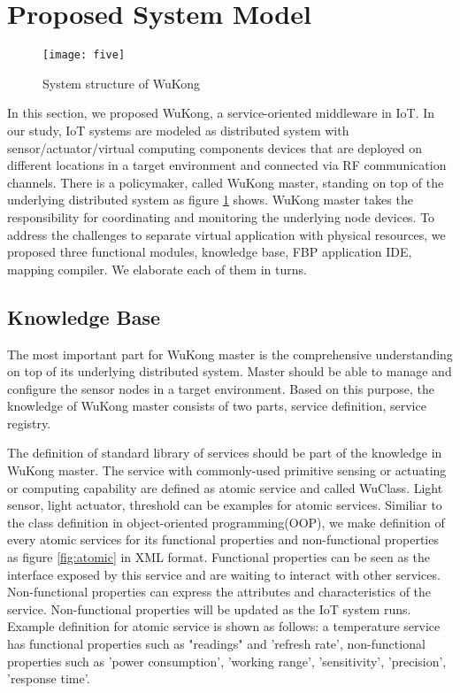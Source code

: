 \section{Proposed System Model}
\label{c:system_model}

\begin{figure}[!t]
\centering
\texttt{[image: five]}
\caption{System structure of WuKong}
\label{fig_structure}
\end{figure}


In this section, we proposed WuKong, a service-oriented middleware in IoT. In our study, IoT systems are modeled as distributed system with sensor/actuator/virtual computing components devices that are deployed on different locations in a target environment and connected via RF communication channels. There is a policymaker, called WuKong master, standing on top of the underlying distributed system as figure \ref{fig_structure} shows. WuKong master takes the responsibility for coordinating and monitoring the underlying node devices. To address the challenges to separate virtual application with physical resources, we proposed three functional modules, knowledge base, FBP application IDE, mapping compiler. We elaborate each of them in turns. 

\subsection{Knowledge Base}

The most important part for WuKong master is the comprehensive understanding on top of its underlying distributed system. Master should be able to manage and configure the sensor nodes in a target environment. Based on this purpose, the knowledge of WuKong master consists of two parts, service definition, service registry.  

The definition of standard library of services should be part of the knowledge in WuKong master. The service with commonly-used primitive sensing or actuating or computing capability are defined as atomic service and called WuClass. Light sensor, light actuator, threshold can be examples for atomic services. Similiar to the class definition in object-oriented programming(OOP), we make definition of every atomic services for its functional properties and non-functional properties as figure \ref{fig:atomic} in XML format. Functional properties can be seen as the interface exposed by this service and are waiting to interact with other services. Non-functional properties can express the attributes and characteristics of the service. Non-functional properties will be updated as the IoT system runs. Example definition for atomic service is shown as follows: a temperature service has functional properties such as "readings" and 'refresh rate', non-functional properties such as 'power consumption', 'working range', 'sensitivity', 'precision', 'response time'. 

